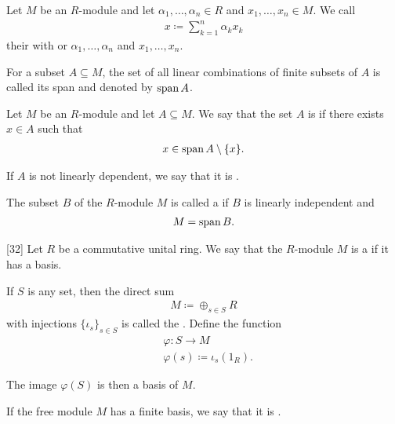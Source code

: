 \begin{definition}\label{def:linear_combination}
  Let \( M \) be an \( R \)-module and let \( \alpha_1, \ldots, \alpha_n \in R \) and \( x_1, \ldots, x_n \in M \). We call
  \begin{align*}
    x \coloneqq \sum_{k=1}^n \alpha_k x_k
  \end{align*}
  their  with  or  \( \alpha_1, \ldots, \alpha_n \) and  \( x_1, \ldots, x_n \).

  For a subset \( A \subseteq M \), the set of all linear combinations of finite subsets of \( A \) is called its span and denoted by \( \operatorname{span}{A} \).
\end{definition}

\begin{definition}\label{def:linear_dependence}
  Let \( M \) be an \( R \)-module and let \( A \subseteq M \). We say that the set \( A \) is  if there exists \( x \in A \) such that
  \begin{align*}
    x \in \operatorname{span}{A} \setminus \{ x \}.
  \end{align*}

  If \( A \) is not linearly dependent, we say that it is .
\end{definition}

\begin{definition}\label{def:module_basis}
  The subset \( B \) of the \( R \)-module \( M \) is called a  if \( B \) is linearly independent and
  \begin{align*}
    M = \operatorname{span}{B}.
  \end{align*}
\end{definition}

\begin{definition}\label{def:free_module}[32]\cite{Kocev2016}
  Let \( R \) be a commutative unital ring. We say that the \( R \)-module \( M \) is a  if it has a basis.

  If \( S \) is any set, then the direct sum
  \begin{align*}
    M \coloneqq \oplus_{s \in S} R
  \end{align*}
  with injections \( \{ \iota_s \}_{s \in S} \) is called the . Define the function
  \begin{align*}
    &\varphi: S \to M \\
    &\varphi(s) \coloneqq \iota_s(1_R).
  \end{align*}

  The image \( \varphi(S) \) is then a basis of \( M \).

  If the free module \( M \) has a finite basis, we say that it is .
\end{definition}

